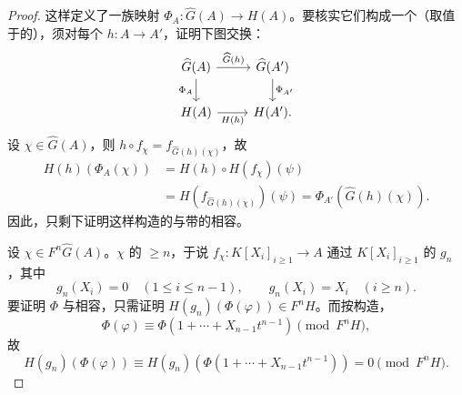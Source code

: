 \begin{proof}
这样定义了一族映射 $\Phi_A:\widehat G(A)\longrightarrow H(A)$。要核实它们构成一个（取值于的），须对每个 $h:A\longrightarrow A'$，证明下图交换：
\[
\begin{tikzcd}
\widehat G(A)\arrow[r,"\widehat G(h)"]\arrow[d,"\Phi_A"'] &
\widehat G(A')\arrow[d,"\Phi_{A'}"]\\
H(A)\arrow[r,"H(h)"'] & H(A').
\end{tikzcd}
\]
设 $\chi\in\widehat G(A)$，则 $h\circ f_\chi=f_{\widehat G(h)(\chi)}$，故
\[
\begin{aligned}
H(h)(\Phi_A(\chi))
&=H(h)\circ H(f_\chi)(\psi)\\
&=H(f_{\widehat G(h)(\chi)})(\psi)
=\Phi_{A'}(\widehat G(h)(\chi)).
\end{aligned}
\]
因此，只剩下证明这样构造的与带的相容。

设 $\chi\in F^n\widehat G(A)$。$\chi$ 的 $\geqslant n$，于说 $f_\chi:K[X_i]_{i\geqslant1}\longrightarrow A$ 通过 $K[X_i]_{i\geqslant1}$ 的 $g_n$ ，其中
\[
g_n(X_i)=0\quad(1\leqslant i\leqslant n-1),\qquad
g_n(X_i)=X_i\quad(i\geqslant n).
\]
要证明 $\Phi$ 与相容，只需证明 $H(g_n)(\Phi(\varphi))\in F^nH$。而按构造，
\[
\Phi(\varphi)\equiv\Phi(1+\cdots+X_{n-1}t^{n-1})\pmod{F^nH},
\]
故
\[
H(g_n)(\Phi(\varphi))\equiv
H(g_n)(\Phi(1+\cdots+X_{n-1}t^{n-1}))=0\pmod{F^nH}.
\]


\end{proof}
